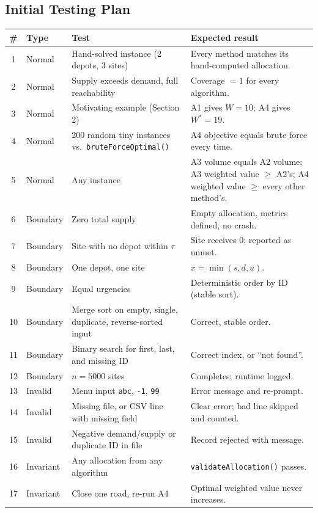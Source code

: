 \documentclass[11pt]{article}
\begin{document}
\subsection{Initial Testing Plan}
{\small
\begin{xltabular}{\textwidth}{@{}c l X X@{}}
\toprule
\# & \textbf{Type} & \textbf{Test} & \textbf{Expected result}\\
\midrule
{} & Normal & Hand-solved instance (2 depots, 3 sites) & Every method matches its hand-computed allocation.\\
2 & Normal & Supply exceeds demand, full reachability & Coverage $=1$ for every algorithm.\\
3 & Normal & Motivating example (Section 2) & A1 gives $W=10$; A4 gives $W^*=19$.\\
4 & Normal & 200 random tiny instances vs.\ \texttt{bruteForceOptimal()} & A4 objective equals brute force every time.\\
5 & Normal & Any instance & A3 volume equals A2 volume; A3 weighted value $\ge$ A2's; A4 weighted value $\ge$ every other method's.\\
6 & Boundary & Zero total supply & Empty allocation, metrics defined, no crash.\\
7 & Boundary & Site with no depot within $\tau$ & Site receives 0; reported as unmet.\\
8 & Boundary & One depot, one site & $x = \min(s, d, u)$.\\
9 & Boundary & Equal urgencies & Deterministic order by ID (stable sort).\\
10 & Boundary & Merge sort on empty, single, duplicate, reverse-sorted input & Correct, stable order.\\
11 & Boundary & Binary search for first, last, and missing ID & Correct index, or ``not found''.\\
12 & Boundary & $n = 5000$ sites & Completes; runtime logged.\\
13 & Invalid & Menu input \texttt{abc}, \texttt{-1}, \texttt{99} & Error message and re-prompt.\\
14 & Invalid & Missing file, or CSV line with missing field & Clear error; bad line skipped and counted.\\
15 & Invalid & Negative demand/supply or duplicate ID in file & Record rejected with message.\\
16 & Invariant & Any allocation from any algorithm & \texttt{validateAllocation()} passes.\\
17 & Invariant & Close one road, re-run A4 & Optimal weighted value never increases.\\

\end{xltabular}}
\end{document}

